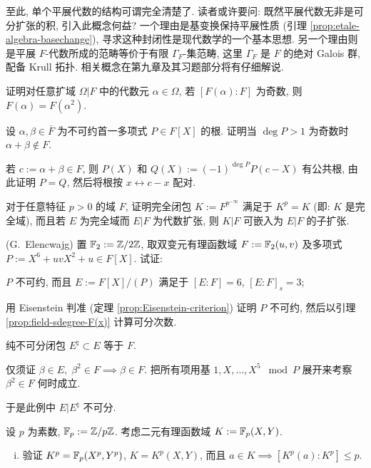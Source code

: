 至此, 单个平展代数的结构可谓完全清楚了. 读者或许要问: 既然平展代数无非是可分扩张的积, 引入此概念何益? 一个理由是基变换保持平展性质 (引理 \ref{prop:etale-algebra-basechange}), 寻求这种封闭性是现代数学的一个基本思想. 另一个理由则是平展 $F$-代数所成的范畴等价于有限 $\Gamma_F$-集范畴, 这里 $\Gamma_F$ 是 $F$ 的绝对 Galois 群, 配备 Krull 拓扑. 相关概念在第九章及其习题部分将有仔细解说.

\begin{Exercises}
	\item 证明对任意扩域 $\Omega|F$ 中的代数元 $\alpha \in \Omega$, 若 $[F(\alpha):F]$ 为奇数, 则 $F(\alpha)=F(\alpha^2)$.
	\item 设 $\alpha, \beta \in \overline{F}$ 为不可约首一多项式 $P \in F[X]$ 的根. 证明当 $\deg P > 1$ 为奇数时 $\alpha+\beta \notin F$.
	\begin{hint} 若 $c := \alpha + \beta \in F$, 则 $P(X)$ 和 $Q(X) := (-1)^{\deg P} P(c-X)$ 有公共根, 由此证明 $P=Q$, 然后将根按 $x \leftrightarrow c-x$ 配对.\end{hint}
	\item 对于任意特征 $p>0$ 的域 $F$, 证明完全闭包 $K := F^{p^{-\infty}}$ 满足于 $K^p = K$ (即: $K$ 是完全域), 而且若 $E$ 为完全域而 $E|F$ 为代数扩张, 则 $K|F$ 可嵌入为 $E|F$ 的子扩张.
	\item (G.\ Elencwajg) 置 $\mathbb{F}_2 := \mathbb{Z}/2\mathbb{Z}$, 取双变元有理函数域 $F := \mathbb{F}_2(u,v)$ 及多项式 $P := X^6 + uvX^2 + u \in F[X]$. 试证:
		\begin{compactenum}[(i)]
			\item $P$ 不可约, 而且 $E := F[X]/(P)$ 满足于 $[E:F]=6$, $[E:F]_s = 3$; \begin{hint} 用 Eisenstein 判准 (定理 \ref{prop:Eisenstein-criterion}) 证明 $P$ 不可约, 然后以引理 \ref{prop:field-sdegree-F(x)} 计算可分次数. \end{hint}
			\item 纯不可分闭包 $E^\natural \subset E$ 等于 $F$. \begin{hint} 仅须证 $\beta \in E, \; \beta^2 \in F \implies \beta \in F$. 把所有项用基 $1, X, \ldots, X^5 \; \bmod P$ 展开来考察 $\beta^2 \in F$ 何时成立. \end{hint}
		\end{compactenum}
		于是此例中 $E|E^\natural$ 不可分.
	\item 设 $p$ 为素数, $\mathbb{F}_p := \mathbb{Z}/p\mathbb{Z}$. 考虑二元有理函数域 $K := \mathbb{F}_p(X,Y)$.
		\begin{enumerate}[(i)]
			\item 验证 $K^p = \mathbb{F}_p(X^p, Y^p)$, $K=K^p(X,Y)$, 而且 $a \in K \implies [K^p(a) : K^p] \leq p$.

\end{enumerate}
\end{Exercises}
